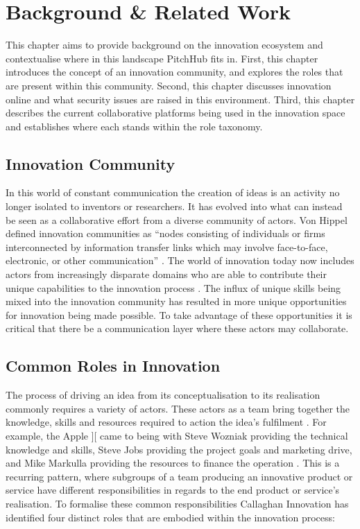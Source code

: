 \chapter{Background \& Related Work}\label{background}

This chapter aims to provide background on the innovation ecosystem and contextualise where in this landscape PitchHub fits in. First, this chapter introduces the concept of an innovation community, and explores the roles that are present within this community. Second, this chapter discusses innovation online and what security issues are raised in this environment. Third, this chapter describes the current collaborative platforms being used in the innovation space and establishes where each stands within the role taxonomy. 

\section{Innovation Community}
In this world of constant communication the creation of ideas is an activity no longer isolated to inventors or researchers. It has evolved into what can instead be seen as a collaborative effort from a diverse community of actors. Von Hippel defined innovation communities as ``nodes consisting of individuals or firms interconnected by information transfer links which may involve face-to-face, electronic, or other communication'' \cite{von2005democratizing}. The world of innovation today now includes actors from increasingly disparate domains who are able to contribute their unique capabilities to the innovation process \cite{che2003optimal}. The influx of unique skills being mixed into the innovation community has resulted in more unique opportunities for innovation being made possible. To take advantage of these opportunities it is critical that there be a communication layer where these actors may collaborate.

\section{Common Roles in Innovation}\label{commonRolesInInnovation}

The process of driving an idea from its conceptualisation to its realisation commonly requires a variety of actors. These actors as a team bring together the knowledge, skills and resources required to action the idea's fulfilment \cite{engelberger1982robotics}. For example, the Apple ][ came to being with Steve Wozniak providing the technical knowledge and skills, Steve Jobs providing the project goals and marketing drive, and Mike Markulla providing the resources to finance the operation \cite{livingston2007founders}. This is a recurring pattern, where subgroups of a team producing an innovative product or service have different responsibilities in regards to the end product or service's realisation. To formalise these common responsibilities Callaghan Innovation has identified four distinct roles that are embodied within the innovation process:

